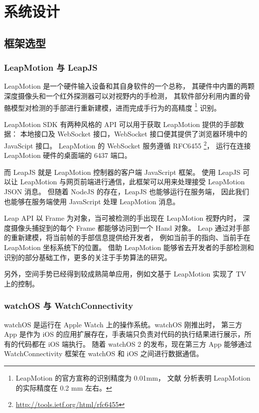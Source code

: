 \chapter{系统设计}

\section{框架选型}

\subsection{LeapMotion 与 LeapJS}

LeapMotion \cite{Leap:2016}是一个硬件输入设备和其自身软件的一个总称，
其硬件中内置的两颗深度摄像头和一个红外探测器可以对视野内的手检测，
其软件部分利用内置的骨骼模型对检测的手部进行重新建模，进而完成手行为的高精度
\footnote{ LeapMotion 的官方宣称的识别精度为 0.01mm，
文献\cite{weichert2013analysis, gdu2016} 分析表明 LeapMotion 的实际精度在 0.2 mm 左右。}
识别。

LeapMotion SDK 有两种风格的 API 可以用于获取 LeapMotion 提供的手部数据：
本地接口及 WebSocket 接口，WebSocket 接口便其提供了浏览器环境中的 JavaScipt 接口。
LeapMotion 的 WebSocket 服务遵循 RFC6455
\footnote{\url{http://tools.ietf.org/html/rfc6455}}，
运行在连接 LeapMotion 硬件的桌面端的 6437 端口。

而 LeapJS 就是 LeapMotion 控制器的客户端 JavaScript 框架。
使用 LeapJS 可以让 LeapMotion 与网页前端进行通信，此框架可以用来处理接受 LeapMotion JSON 消息。
但随着 NodeJS 的存在，LeapJS 也能够运行在服务端，
因此我们也能够在服务端使用 JavaScript 处理 LeapMotion 消息。

Leap API 以 Frame 为对象，当可被检测的手出现在 LeapMotion 视野内时，
深度摄像头捕捉到的每个 Frame 都能够访问到一个 Hand 对象。
Leap 通过对手部的重新建模，将当前帧的手部信息提供给开发者，
例如当前手的指向、当前手在 LeapMotion 坐标系统下的位置。
借助 LeapMotion 能够省去开发者的手部检测和识别的部分基础工作，更多的关注于手势算法的研究\cite{garber2013gestural,xusuibin2015,panjiajia2015,huhong2015,marin2014hand}。

另外，空间手势已经得到较成熟简单应用，例如文\cite{zaicti2015free}基于 LeapMotion 实现了 TV 上的控制。

\subsection{watchOS 与 WatchConnectivity}

watchOS 是运行在 Apple Watch 上的操作系统。watchOS 刚推出时，
第三方 App 是作为 iOS 的应用扩展存在，手表端只负责对代码的执行结果进行展示，所有的代码都在 iOS 端执行。
随着 watchOS 2 的发布，现在第三方 App 能够通过 WatchConnectivity 框架在 watchOS 和 iOS 之间进行数据通信。

